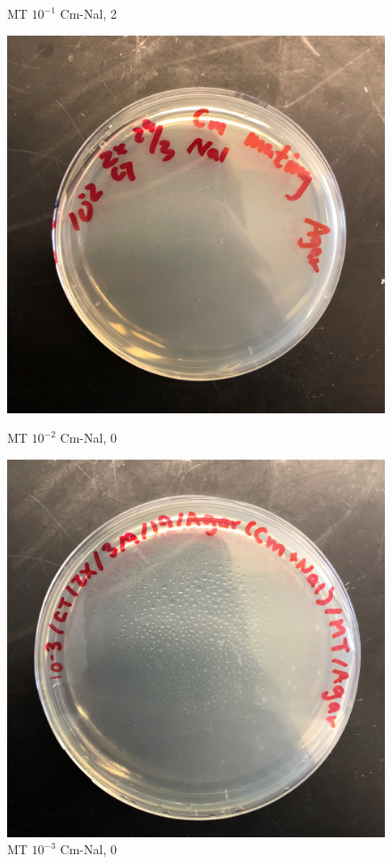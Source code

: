 \documentclass{article}
\begin{document}
\begin{figure}[H]
\begin{minipage}[t]{0.24\textwidth}
					\caption{MT $10^{-1}$ Cm-Nal, 2}
				\end{minipage}
				\begin{minipage}[t]{0.24\textwidth}
					\centering
					\includegraphics[width = 0.9\linewidth]{Mate_2_NalCm.jpg}
					\caption{MT $10 ^ {-2}$ Cm-Nal, 0}
				\end{minipage}
				\begin{minipage}[t]{0.24\textwidth}
					\centering
					\includegraphics[width = 0.9\linewidth]{Mate_3_NalCm.jpg}
					\caption{MT $10 ^ {-3}$ Cm-Nal, 0}
				\end{minipage}
			\end{figure}
\end{document}
